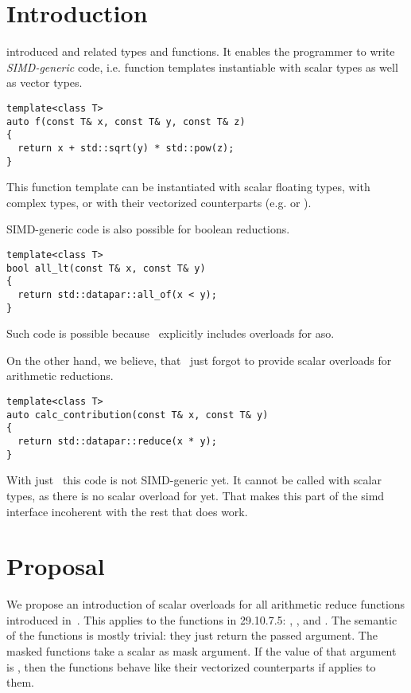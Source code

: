 \pagestyle{scrheadings}




\section{Introduction}
\cite{P1928R15} introduced  and related types and functions.
It enables the programmer to write \emph{SIMD-generic} code, i.e. function templates instantiable
with scalar types as well as vector types.
\medskip\begin{lstlisting}[style=Vc]
template<class T>
auto f(const T& x, const T& y, const T& z)
{
  return x + std::sqrt(y) * std::pow(z);
}
\end{lstlisting}
This function template can be instantiated with scalar floating types, with complex types, or with their
vectorized counterparts (e.g.  or ).

SIMD-generic code is also possible for boolean reductions.
\medskip\begin{lstlisting}[style=Vc]
template<class T>
bool all_lt(const T& x, const T& y)
{
  return std::datapar::all_of(x < y);
}
\end{lstlisting}
Such code is possible because~\cite{P1928R15} explicitly includes overloads for  aso.

On the other hand, we believe, that~\cite{P1928R15} just forgot to provide scalar overloads for arithmetic reductions.
\medskip\begin{lstlisting}[style=Vc]
template<class T>
auto calc_contribution(const T& x, const T& y)
{
  return std::datapar::reduce(x * y);
}
\end{lstlisting}
With just~\cite{P1928R15} this code is not SIMD-generic yet.
It cannot be called with scalar types, as there is no scalar overload for  yet.
That makes this part of the simd interface incoherent with the rest that does work.

\section{Proposal}

We propose an introduction of scalar overloads for all arithmetic reduce functions introduced in~\cite{P1928R15}.
This applies to the functions in 29.10.7.5: , , and .
The semantic of the functions is mostly trivial: they just return the passed argument.
The masked functions take a scalar  as mask argument.
If the value of that argument is , then the functions behave like their vectorized counterparts
if  applies to them.

